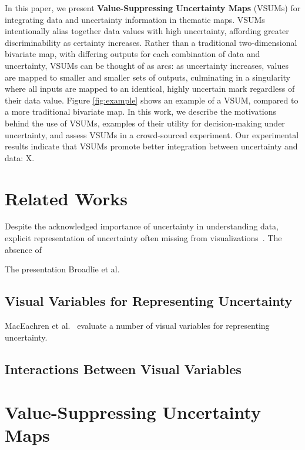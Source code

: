 \documentclass{vgtc}                          %
\begin{document}
In this paper, we present \textbf{Value-Suppressing Uncertainty Maps} (VSUMs) for integrating data and uncertainty information in thematic maps. VSUMs intentionally alias together data values with high uncertainty, affording greater discriminability as certainty increases. Rather than a traditional two-dimensional bivariate map, with differing outputs for each combination of data and uncertainty, VSUMs can be thought of as arcs: as uncertainty increases, values are mapped to smaller and smaller sets of outputs, culminating in a singularity where all inputs are mapped to an identical, highly uncertain mark regardless of their data value. Figure \ref{fig:example} shows an example of a VSUM, compared to a more traditional bivariate map. In this work, we describe the motivations behind the use of VSUMs, examples of their utility for decision-making under uncertainty, and assess VSUMs in a crowd-sourced experiment. Our experimental results indicate that VSUMs promote better integration between uncertainty and data: X.

\exampleFig 
\section{Related Works}


Despite the acknowledged importance of uncertainty in understanding data, explicit representation of uncertainty often missing from visualizations~\cite{boukhelifa2009uncertainty}. The absence of 
 
The presentation Broadlie et al.~\cite{brodlie2012review}
\subsection{Visual Variables for Representing Uncertainty}

MacEachren et al.~\cite{maceachren2012visual} evaluate a number of visual variables for representing uncertainty. 
\subsection{Interactions Between Visual Variables}

\section{Value-Suppressing Uncertainty Maps}
\end{document}
